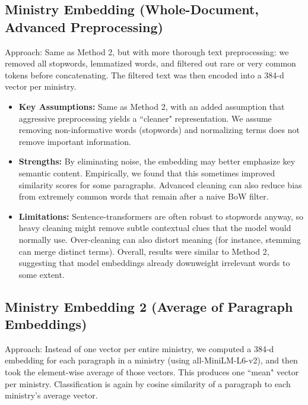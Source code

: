 \documentclass{report}
\begin{document}
\subsection{Ministry Embedding (Whole-Document, Advanced Preprocessing)}
Approach: Same as Method 2, but with more thorough text preprocessing: we removed all stopwords, lemmatized words, and filtered out rare or very common tokens before concatenating. The filtered text was then encoded into a 384-d vector per ministry.

\begin{itemize}
    \item \textbf{Key Assumptions:} Same as Method 2, with an added assumption that aggressive preprocessing yields a ``cleaner" representation. We assume removing non-informative words (stopwords) and normalizing terms does not remove important information.
    \item \textbf{Strengths:} By eliminating noise, the embedding may better emphasize key semantic content. Empirically, we found that this sometimes improved similarity scores for some paragraphs. Advanced cleaning can also reduce bias from extremely common words that remain after a naive BoW filter.
    \item \textbf{Limitations:} Sentence-transformers are often robust to stopwords anyway, so heavy cleaning might remove subtle contextual clues that the model would normally use. Over-cleaning can also distort meaning (for instance, stemming can merge distinct terms). Overall, results were similar to Method 2, suggesting that model embeddings already downweight irrelevant words to some extent.
\end{itemize}

\subsection{Ministry Embedding 2 (Average of Paragraph Embeddings)}\label{embed-avg}
Approach: Instead of one vector per entire ministry, we computed a 384-d embedding for each paragraph in a ministry (using all-MiniLM-L6-v2), and then took the element-wise average of those vectors. This produces one ``mean" vector per ministry. Classification is again by cosine similarity of a paragraph to each ministry's average vector.
\end{document}

